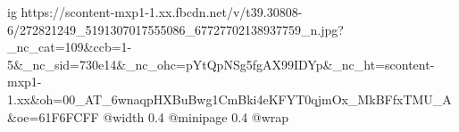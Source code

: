  
 
 
 
 

\ifcmt
  ig https://scontent-mxp1-1.xx.fbcdn.net/v/t39.30808-6/272821249_5191307017555086_67727702138937759_n.jpg?_nc_cat=109&ccb=1-5&_nc_sid=730e14&_nc_ohc=pYtQpNSg5fgAX99IDYp&_nc_ht=scontent-mxp1-1.xx&oh=00_AT_6wnaqpHXBuBwg1CmBki4eKFYT0qjmOx_MkBFfxTMU_A&oe=61F6FCFF
  @width 0.4
  @minipage 0.4
  @wrap \parpic[r]
\fi
